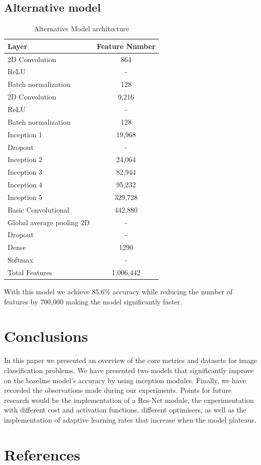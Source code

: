\documentclass[10pt,twocolumn,letterpaper]{article}
\begin{document}
\subsection{Alternative model}
\begin{table}[h!]
\centering
\begin{center}
\begin{tabular}{|l|c|}
\hline
Layer & Feature Number \\
\hline\hline
2D Convolution & 864 \\
ReLU & - \\
Batch normalization & 128 \\
2D Convolution & 9,216 \\
ReLU & - \\
Batch normalization & 128 \\
Inception 1 & 19,968\\
Dropout & -\\
Inception 2 & 24,064\\
Inception 3 & 82,944\\
Inception 4 & 95,232\\
Inception 5 & 329,728\\
Basic Convolutional & 442,880\\
Global average pooling 2D & -\\
Dropout & -\\
Dense & 1290\\
Softmax & -\\
Total Features & 1,006,442\\
\hline
\end{tabular}
\end{center}
\caption{Alternative Model architecture}
\end{table}

With this model we achieve 85.6\% accuracy while reducing the number of features by 700,000 making the model significantly faster.


\section{Conclusions}
In this paper we presented an overview of the core metrics and datasets for image classification problems. We have presented two models that significantly improve on the baseline model's accuracy by using inception modules. Finally, we have recorded the observations made during our experiments. Points for future research would be the implementation of a Res-Net module, the experimentation with different cost and activation functions, different optimisers, as well as the implementation of adaptive learning rates that increase when the model plateaus. 


\section{References}
{\small


}
\end{document}
